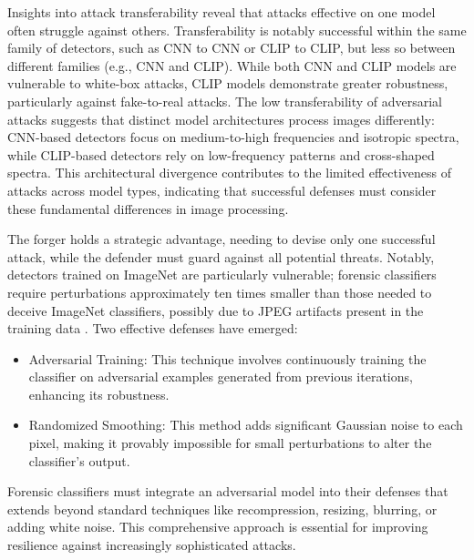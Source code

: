 \documentclass[conference]{IEEEtran} %
\begin{document}
Insights into attack transferability \cite{mardeenpaper2} reveal that attacks effective on one model often struggle against others. Transferability is notably successful within the same family of detectors, such as CNN to CNN or CLIP to CLIP, but less so between different families (e.g., CNN and CLIP). While both CNN and CLIP models are vulnerable to white-box attacks, CLIP models demonstrate greater robustness, particularly against fake-to-real attacks.
The low transferability of adversarial attacks suggests that distinct model architectures process images differently:
CNN-based detectors focus on medium-to-high frequencies and isotropic spectra, while CLIP-based detectors rely on low-frequency patterns and cross-shaped spectra.
This architectural divergence contributes to the limited effectiveness of attacks across model types, indicating that successful defenses must consider these fundamental differences in image processing.

The forger holds a strategic advantage, needing to devise only one successful attack, while the defender must guard against all potential threats. Notably, detectors trained on ImageNet \cite{denglarge} are particularly vulnerable; forensic classifiers require perturbations approximately ten times smaller than those needed to deceive ImageNet classifiers, possibly due to JPEG artifacts present in the training data \cite{mardeenpaper1}.
Two effective defenses have emerged:
\begin{itemize}
    \item Adversarial Training: This technique involves continuously training the classifier on adversarial examples generated from previous iterations, enhancing its robustness.
    \item Randomized Smoothing: This method adds significant Gaussian noise to each pixel, making it provably impossible for small perturbations to alter the classifier's output.
\end{itemize}

Forensic classifiers must integrate an adversarial model into their defenses that extends beyond standard techniques like recompression, resizing, blurring, or adding white noise. This comprehensive approach is essential for improving resilience against increasingly sophisticated attacks.


\end{document}
